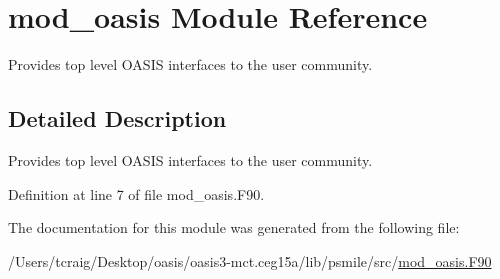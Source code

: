 \hypertarget{classmod__oasis}{\section{mod\+\_\+oasis Module Reference}
\label{classmod__oasis}
}


Provides top level O\+A\+S\+I\+S interfaces to the user community.  




\subsection{Detailed Description}
Provides top level O\+A\+S\+I\+S interfaces to the user community. 

Definition at line 7 of file mod\+\_\+oasis.\+F90.



The documentation for this module was generated from the following file\+:\begin{DoxyCompactItemize}
\item 
/\+Users/tcraig/\+Desktop/oasis/oasis3-\/mct.\+ceg15a/lib/psmile/src/\hyperlink{mod__oasis_8_f90}{mod\+\_\+oasis.\+F90}\end{DoxyCompactItemize}
